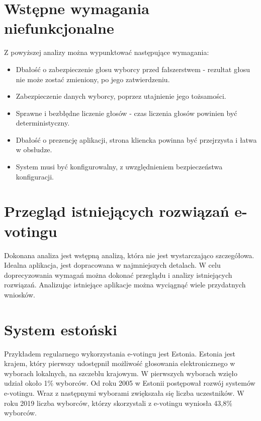 \documentclass[a4paper,13pt]{report}
\begin{document}
\section{Wstępne wymagania niefunkcjonalne}
Z powyższej analizy można wypunktować następujące wymagania:
\begin{itemize}

\item Dbałość o zabezpieczenie głosu wyborcy przed fałszerstwem - rezultat głosu nie może zostać zmieniony, po jego zatwierdzeniu.

\item Zabezpieczenie danych wyborcy, poprzez utajnienie jego tożsamości.

\item Sprawne i bezbłędne liczenie głosów - czas liczenia głosów powinien być deterministyczny.

\item Dbałość o prezencję aplikacji, strona kliencka powinna być przejrzysta i łatwa w obsłudze.

\item System musi być konfigurowalny, z uwzględnieniem bezpieczeństwa konfiguracji.
\end{itemize}


\section{Przegląd istniejących rozwiązań e-votingu}
Dokonana analiza jest wstępną analizą, która nie jest wystarczająco szczegółowa. Idealna aplikacja, jest dopracowana w najmniejszych detalach. W celu doprecyzowania wymagań można dokonać przeglądu i analizy istniejących rozwiązań. Analizując istniejące aplikacje można wyciągnąć wiele przydatnych wniosków.
\section{System estoński}
Przykładem regularnego wykorzystania e-votingu jest Estonia. Estonia jest krajem, który pierwszy udostępnił możliwość głosowania elektronicznego w wyborach lokalnych, na szczeblu krajowym. W pierwszych wyborach wzięło udział około 1\% wyborców. Od roku 2005 w Estonii postępował rozwój systemów e-votingu. Wraz z następnymi wyborami zwiększała się liczba uczestników. W roku 2019 liczba wyborców, którzy skorzystali z e-votingu wyniosła 43,8\% wyborców.
\end{document}

